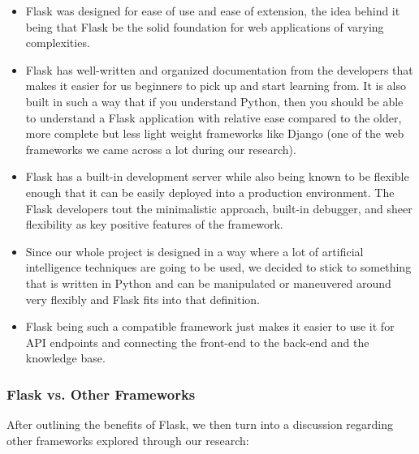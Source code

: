 \documentclass[titlepage, 12pt]{article}
\begin{document}
\begin{itemize}
    \item Flask was designed for ease of use and ease of extension, the idea behind it being that Flask be the solid foundation for web applications of varying complexities.
    \item Flask has well-written and organized documentation from the developers that makes it easier for us beginners to pick up and start learning from. It is also built in such a way that if you understand Python, then you should be able to understand a Flask application with relative ease compared to the older, more complete but less light weight frameworks like Django (one of the web frameworks we came across a lot during our research). 
    \item Flask has a built-in development server while also being known to be flexible enough that it can be easily deployed into a production environment. The Flask developers tout the minimalistic approach, built-in debugger, and sheer flexibility as key positive features of the framework.
    \item Since our whole project is designed in a way where a lot of artificial intelligence techniques are going to be used, we decided to stick to something that is written in Python and can be manipulated or maneuvered around very flexibly and Flask fits into that definition.
    \item Flask being such a compatible framework just makes it easier to use it for API endpoints and connecting the front-end to the back-end and the knowledge base.
\end{itemize}

\subsubsection{Flask vs. Other Frameworks}

After outlining the benefits of Flask, we then turn into a discussion regarding other frameworks explored through our research:
\end{document}
